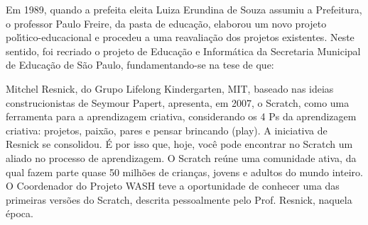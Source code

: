 \documentclass[
12pt,		%
openright,	%
twoside,  %
a4paper,			%
chapter=TITLE,		%
english,			%
french,				%
spanish,			%
brazil				%
]{USPSC-classe/USPSC}
\begin{document}
Em 1989, quando a prefeita eleita Luiza Erundina de Souza assumiu a Prefeitura, o professor Paulo Freire, da pasta de educa\c{c}\~ao, elaborou um novo projeto pol\'{\i}tico-educacional e procedeu a uma reavalia\c{c}\~ao dos projetos existentes. Neste sentido, foi recriado o projeto de Educa\c{c}\~ao e Inform\'atica da Secretaria Municipal de Educa\c{c}\~ao de S\~ao Paulo, fundamentando-se na tese de que:















\noindent\begin{center}\mbox{\centering{}}\end{center}


Mitchel Resnick, do Grupo Lifelong Kindergarten, MIT, baseado nas ideias construcionistas de Seymour Papert, apresenta, em 2007, o Scratch, como uma ferramenta para a aprendizagem criativa, considerando  os 4 Ps da aprendizagem criativa: projetos, paix\~ao, pares e pensar brincando (play). A  iniciativa de Resnick se consolidou. \'E por isso que, hoje, voc\^e pode encontrar no Scratch um aliado no processo de aprendizagem. O Scratch re\'une uma comunidade ativa, da qual fazem parte quase 50 milh\~oes de crian\c{c}as, jovens e adultos do mundo inteiro. O Coordenador do Projeto WASH teve a oportunidade de conhecer uma das primeiras vers\~oes do Scratch, descrita pessoalmente pelo Prof. Resnick, naquela \'epoca.
\end{document}
